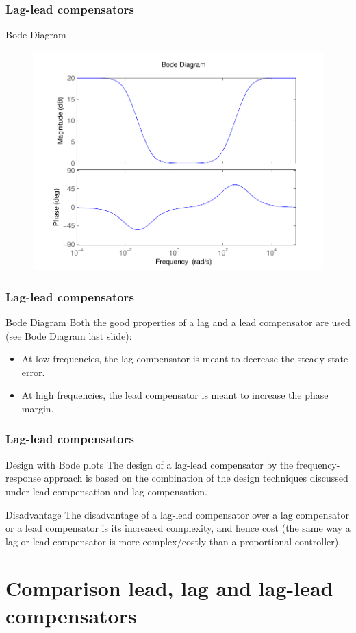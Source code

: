 \begin{frame}
\frametitle{Lag-lead compensators}
\begin{block}{Bode Diagram}
\begin{figure}
	\centering
	\includegraphics[width=0.5
	\linewidth]{laglead}
\end{figure}	
\end{block}
\end{frame}

\begin{frame}
\frametitle{Lag-lead compensators}	\begin{block}{Bode Diagram}
	Both the good properties of a lag and a lead compensator are used (see Bode Diagram last slide):
	\begin{itemize}
	\item At low frequencies, the lag compensator is meant to decrease the steady state error.
	\item At high frequencies, the lead compensator is meant to increase the phase margin.
	\end{itemize}
\end{block}
\end{frame}

\begin{frame}
\frametitle{Lag-lead compensators}
\begin{block}{Design with Bode plots}
	The
	design of a lag-lead compensator by the frequency-response approach is based on the
	combination of the design techniques discussed under lead compensation and lag
	compensation.
\end{block}
\begin{block}{Disadvantage}
	The disadvantage of a lag-lead compensator over a lag compensator or a lead compensator is its increased complexity, and hence cost (the same way a lag or lead compensator is more complex/costly than a proportional controller).
\end{block}
\end{frame}

\section{Comparison lead, lag and lag-lead compensators}

